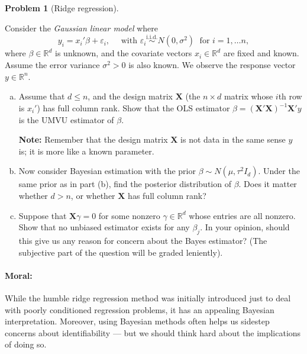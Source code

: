 \documentclass{article}
\newcommand{\RR}{\mathbb{R}}
\newcommand{\simiid}{\overset{\text{i.i.d.}}{\sim}}
\newcommand{\ep}{\varepsilon}
\theoremstyle{definition}
\newtheorem{problem}{Problem}
\begin{document}
\begin{problem}[Ridge regression]
\label{prob:ridge-bayes}

Consider the {\em Gaussian linear model} where
\[
y_i = x_i' \beta + \ep_i, \quad \text{ with } \ep_i \simiid N(0,\sigma^2) \;\text{ for } i =1, \ldots n,
\]
where $\beta \in \RR^d$ is unknown, and the covariate vectors $x_i \in \RR^d$ are fixed and known. Assume the error variance $\sigma^2>0$ is also known. We observe the response vector $y \in \RR^n$.
\begin{enumerate}[(a)]
\item Assume that $d \leq n$, and the design matrix $\mathbf{X}$ (the $n \times d$ matrix whose $i$th row is $x_i'$) has full column rank. Show that the OLS estimator $\hat\beta = (\mathbf{X}'\mathbf{X})^{-1}\mathbf{X}'y$ is the UMVU estimator of $\beta$. 

{\bf Note:} Remember that the design matrix $\mathbf{X}$ is not data in the same sense $y$ is; it is more like a known parameter.




\item Now consider Bayesian estimation with the prior $\beta \sim N(\mu, \tau^2 I_d)$.  Under the same prior as in part (b), find the posterior distribution of $\beta$. Does it matter whether $d > n$, or whether $\mathbf{X}$ has full column rank?






\item Suppose that $\mathbf{X}\gamma = 0$ for some nonzero $\gamma \in \RR^d$ whose entries are all nonzero. Show that no unbiased estimator exists for any $\beta_j$. In your opinion, should this give us any reason for concern about the Bayes estimator? (The subjective part of the question will be graded leniently).



\end{enumerate}

\paragraph{Moral:} While the humble ridge regression method was initially introduced just to deal with poorly conditioned regression problems, it has an appealing Bayesian interpretation. Moreover, using Bayesian methods often helps us sidestep concerns about identifiability --- but we should think hard about the implications of doing so.


\end{problem}
\end{document}
